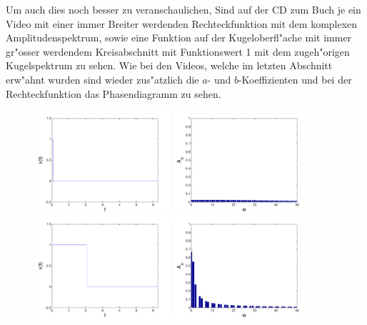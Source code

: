 \begin{refsection}
Um auch dies noch besser zu veranschaulichen, Sind auf der CD zum Buch 
je ein Video mit einer immer Breiter werdenden Rechteckfunktion mit dem 
komplexen Amplitudenspektrum, sowie eine Funktion auf der 
Kugeloberfl"ache mit immer gr"osser werdendem Kreisabschnitt mit 
Funktionswert 1 mit dem zugeh"origen Kugelspektrum zu sehen. 
Wie bei den Videos, welche im letzten Abschnitt erw"ahnt wurden sind 
wieder zus"atzlich die $a$- und $b$-Koeffizienten und bei der 
Rechteckfunktion das Phasendiagramm zu sehen.
\begin{figure}
\centering
\includegraphics[width=0.45\textwidth]{kugel/Dkonstant/Rechteck1_1.pdf}
\includegraphics[width=0.45\textwidth]{kugel/Dkonstant/Rechteck1_2.pdf}
\includegraphics[width=0.45\textwidth]{kugel/Dkonstant/Rechteck2_1.pdf}
\includegraphics[width=0.45\textwidth]{kugel/Dkonstant/Rechteck2_2.pdf}

\end{figure}
\end{refsection}
